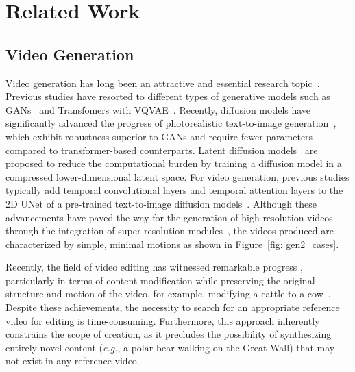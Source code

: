 \documentclass[10pt,twocolumn,letterpaper]{article}
\begin{document}
 \section{Related Work}

\subsection{Video Generation}


Video generation has long been an attractive and essential research topic~\cite{ranzato2014video, vondrick2016generating,ge2022TATS}. Previous studies have resorted to different types of generative models such as GANs~\cite{goodfellow2014generative,li2018video,pan2018create,tian2021good} and Transfomers with VQVAE~\cite{yan2021videogpt,ge2022long,hong2022cogvideo}. Recently, diffusion models have significantly advanced the progress of photorealistic text-to-image generation~\cite{saharia2022photorealistic,balaji2022ediffi}, which exhibit robustness superior to GANs and require fewer parameters compared to transformer-based counterparts. Latent diffusion models~\cite{rombach2022high} are proposed to reduce the computational burden by training a diffusion model in a compressed lower-dimensional latent space. For video generation, previous studies typically add temporal convolutional layers and temporal attention layers to the 2D UNet of a pre-trained text-to-image diffusion models~\cite{singer2022make,he2022LVDM,zhou2022magicvideo,gu2023seer,wang2023modelscope,wang2023videocomposer,luo2023videofusion,ge2023preserve}. Although these advancements have paved the way for the generation of high-resolution videos through the integration of super-resolution modules~\cite{lu2023EGSVR}, the videos produced are characterized by simple, minimal motions as shown in Figure~\ref{fig: gen2_cases}. 

Recently, the field of video editing has witnessed remarkable progress \cite{yin2023dragnuwa,zhang2023magicavatar,molad2023dreamix}, particularly in terms of content modification while preserving the original structure and motion of the video, for example, modifying a cattle to a cow~\cite{gen1, tuneavideo}. Despite these achievements, the necessity to search for an appropriate reference video for editing is time-consuming. Furthermore, this approach inherently constrains the scope of creation, as it precludes the possibility of synthesizing entirely novel content (\textit{e.g.}, a polar bear walking on the 
Great Wall) that may not exist in any reference video.
\end{document}
